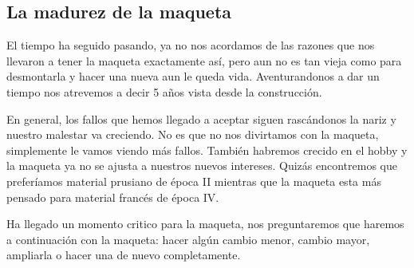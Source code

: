 \subsection{La madurez de la maqueta}
El tiempo ha seguido pasando, ya no nos acordamos de las razones que nos llevaron a tener la maqueta exactamente así, pero aun no es tan vieja como para desmontarla y hacer una nueva aun le queda vida. Aventurandonos a dar un tiempo nos atrevemos a decir 5 años vista desde la construcción.

En general, los fallos que hemos llegado a aceptar siguen rascándonos la nariz y nuestro malestar va creciendo. No es que no nos divirtamos con la maqueta, simplemente le vamos viendo más fallos. También habremos crecido en el hobby y la maqueta ya no se ajusta a nuestros nuevos intereses. Quizás encontremos que preferíamos material prusiano de época II mientras que la maqueta esta más pensado para material francés de época IV.

Ha llegado un momento critico para la maqueta, nos preguntaremos que haremos a continuación con la maqueta: hacer algún cambio menor, cambio mayor, ampliarla o hacer una de nuevo completamente.


